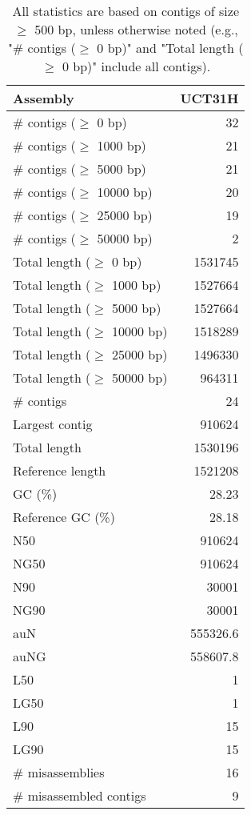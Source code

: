 \documentclass[12pt,a4paper]{article}
\begin{document}
\begin{table}[ht]
\begin{center}
\caption{All statistics are based on contigs of size $\geq$ 500 bp, unless otherwise noted (e.g., "\# contigs ($\geq$ 0 bp)" and "Total length ($\geq$ 0 bp)" include all contigs).}
\begin{tabular}{|l*{1}{|r}|}
\hline
Assembly & UCT31H \\ \hline
\# contigs ($\geq$ 0 bp) & 32 \\ \hline
\# contigs ($\geq$ 1000 bp) & 21 \\ \hline
\# contigs ($\geq$ 5000 bp) & 21 \\ \hline
\# contigs ($\geq$ 10000 bp) & 20 \\ \hline
\# contigs ($\geq$ 25000 bp) & 19 \\ \hline
\# contigs ($\geq$ 50000 bp) & 2 \\ \hline
Total length ($\geq$ 0 bp) & 1531745 \\ \hline
Total length ($\geq$ 1000 bp) & 1527664 \\ \hline
Total length ($\geq$ 5000 bp) & 1527664 \\ \hline
Total length ($\geq$ 10000 bp) & 1518289 \\ \hline
Total length ($\geq$ 25000 bp) & 1496330 \\ \hline
Total length ($\geq$ 50000 bp) & 964311 \\ \hline
\# contigs & 24 \\ \hline
Largest contig & 910624 \\ \hline
Total length & 1530196 \\ \hline
Reference length & 1521208 \\ \hline
GC (\%) & 28.23 \\ \hline
Reference GC (\%) & 28.18 \\ \hline
N50 & 910624 \\ \hline
NG50 & 910624 \\ \hline
N90 & 30001 \\ \hline
NG90 & 30001 \\ \hline
auN & 555326.6 \\ \hline
auNG & 558607.8 \\ \hline
L50 & 1 \\ \hline
LG50 & 1 \\ \hline
L90 & 15 \\ \hline
LG90 & 15 \\ \hline
\# misassemblies & 16 \\ \hline
\# misassembled contigs & 9 \\ \hline

\end{tabular}
\end{center}
\end{table}
\end{document}
